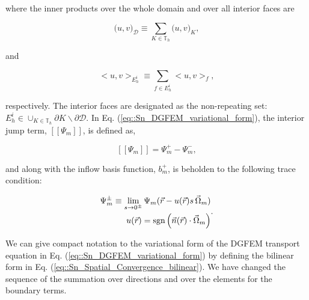 \noindent where the inner products over the whole domain and over all interior faces are

\begin{equation}
\label{eq::Sn_DGFEM_vol_inner_prod}
\Big( u, v \Big)_{\mathcal{D}} \equiv \sum_{K \in \mathbb{T}_h}  \Big( u, v \Big)_{K} ,
\end{equation}

\noindent and 

\begin{equation}
\label{eq::Sn_DGFEM_surf_inner_prod}
\Big< u, v \Big>_{E_h^i} \equiv \sum_{f \in E_h^i}  \Big< u, v \Big>_{f} ,
\end{equation}

\noindent respectively. The interior faces are designated as the non-repeating set: $E_h^i \in \cup_{K \in  \mathbb{T}_h} \partial K \backslash \partial \mathcal{D}$. In Eq. (\ref{eq::Sn_DGFEM_variational_form}), the interior jump term, $[\![ \Psi_m]\!]$, is defined as,

\begin{equation}
\label{eq::Sn_Spatial_Convergence_jump}
[\![ \Psi_m]\!] = \Psi_m^{+} - \Psi_m^{-} ,
\end{equation}

\noindent and along with the inflow basis function, $b_m^{+}$, is beholden to the following trace condition:

\begin{equation}
\label{eq::Sn_Spatial_Convergence_trace}
\begin{aligned}
\Psi_m^{\pm} \equiv \lim\displaylimits_{s \rightarrow 0^\pm} \Psi_m (\vec{r} - u (\vec{r})  s  \, \vec{\Omega}_m ) \\
u (\vec{r}) = \text{sgn} \left(  \vec{n} (\vec{r}) \cdot  \vec{\Omega}_m \right)
\end{aligned} .
\end{equation}

We can give compact notation to the variational form of the DGFEM transport equation in Eq. (\ref{eq::Sn_DGFEM_variational_form}) by defining the bilinear form in Eq. (\ref{eq::Sn_Spatial_Convergence_bilinear}). We have changed the sequence of the summation over directions and over the elements for the boundary terms.

